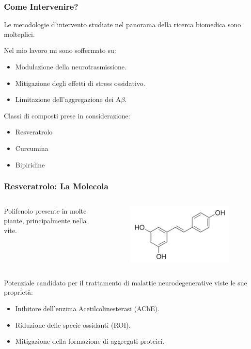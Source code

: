 \documentclass[9pt]{beamer}
\begin{document}
\begin{frame}
	\frametitle{Come Intervenire?}
	Le metodologie d'intervento studiate nel panorama della ricerca biomedica sono molteplici.
	
	Nel mio lavoro mi sono soffermato su:
	\begin{itemize}
		\item Modulazione della neurotrasmissione.
		\item Mitigazione degli effetti di stress ossidativo.
		\item Limitazione dell'aggregazione dei A$\beta$.
	\end{itemize}
	
	Classi di composti prese in considerazione:
	\begin{itemize}
		\item Resveratrolo %
		\item Curcumina
		\item Bipiridine
	\end{itemize}
	
	
\end{frame}


\begin{frame}
	\frametitle{Resveratrolo: La Molecola}
	\begin{columns}
		\begin{column}{0.5\textwidth}
			Polifenolo presente in molte piante, principalmente nella vite.
		\end{column}
		\begin{column}{0.5\textwidth}
			\begin{figure}
				\includegraphics[width=.8\textwidth]{immagini/resveratrolo.png}
			\end{figure}
		\end{column}
	\end{columns}
	\medskip
	
	
	Potenziale candidato per il trattamento di malattie neurodegenerative viste le sue proprietà:
	\begin{itemize}
		\item Inibitore dell'enzima Acetilcolinesterasi (AChE).
		\item Riduzione delle specie ossidanti (ROI).
		\item Mitigazione della formazione di aggregati proteici.
	\end{itemize}
\end{frame}
\end{document}
